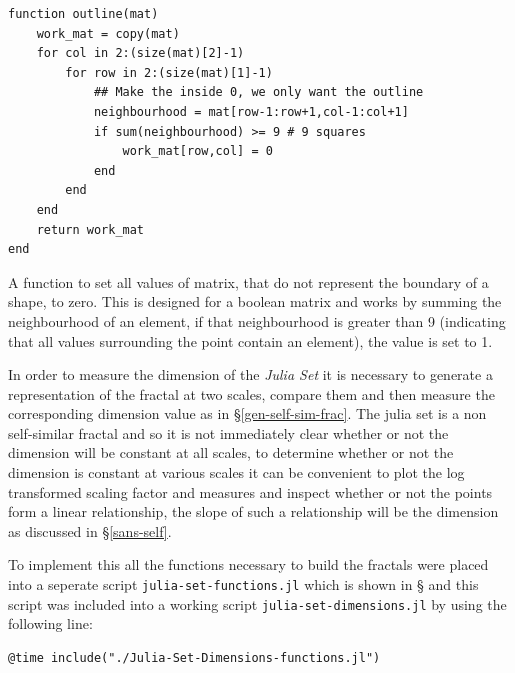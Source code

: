 \documentclass[a4paper,11pt,twoside]{article}
\begin{document}
\begin{listing}[htbp]
\begin{verbatim}
function outline(mat)
    work_mat = copy(mat)
    for col in 2:(size(mat)[2]-1)
        for row in 2:(size(mat)[1]-1)
            ## Make the inside 0, we only want the outline
            neighbourhood = mat[row-1:row+1,col-1:col+1]
            if sum(neighbourhood) >= 9 # 9 squares
                work_mat[row,col] = 0
            end
        end
    end
    return work_mat
end
\end{verbatim}
\caption{\label{outline-func}A function to set all values of matrix, that do not represent the boundary of a shape, to zero. This is designed for a boolean matrix and works by summing the neighbourhood of an element, if that neighbourhood is greater than 9 (indicating that all values surrounding the point contain an element), the value is set to 1.}
\end{listing}

In order to measure the dimension of the \emph{Julia Set} it is necessary to generate
a representation of the fractal at two scales, compare them and then
measure the corresponding dimension value as in \S \ref{gen-self-sim-frac}. The julia set
is a non self-similar fractal and so it is not immediately clear whether or not
the dimension will be constant at all scales, to determine whether or not the
dimension is constant at various scales it can be convenient to plot the log
transformed scaling factor and measures and inspect whether or not the points
form a linear relationship, the slope of such a relationship will be the
dimension as discussed in \S \ref{sans-self}.

To implement this all the functions necessary to build the fractals were placed
into a seperate script \texttt{julia-set-functions.jl} which is shown in \S
and this script was included into a working script
\texttt{julia-set-dimensions.jl} by using the following line:

\begin{verbatim}
@time include("./Julia-Set-Dimensions-functions.jl")
\end{verbatim}
\end{document}
